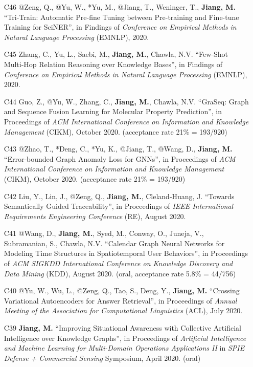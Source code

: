 \documentclass[10pt]{article}
\newenvironment{myindentpar}[1]%
{\begin{list}{}%
         {\setlength{\leftmargin}{#1}}%
         \item[]%
}
{\end{list}}
\newcounter{list}
\begin{document}
\begin{myindentpar}{0.00cm}
\begin{enumerate}[leftmargin=.5cm]
\item[C46] @Zeng, Q., @Yu, W., *Yu, M., @Jiang, T., Weninger, T., \textbf{Jiang, M.} ``Tri-Train: Automatic Pre-fine Tuning between Pre-training and Fine-tune Training for SciNER'', in Findings of \textit{Conference on Empirical Methods in Natural Language Processing} (EMNLP), 2020.

\item[C45] Zhang, C., Yu, L., Saebi, M., \textbf{Jiang, M.}, Chawla, N.V. ``Few-Shot Multi-Hop Relation Reasoning over Knowledge Bases'', in Findings of \textit{Conference on Empirical Methods in Natural Language Processing} (EMNLP), 2020.

\item[C44] Guo, Z., @Yu, W., Zhang, C., \textbf{Jiang, M.}, Chawla, N.V. ``GraSeq: Graph and Sequence Fusion Learning for Molecular Property Prediction'', in Proceedings of \textit{ACM International Conference on Information and Knowledge Management} (CIKM), October 2020. (acceptance rate 21\% = 193/920)
		
\item[C43] @Zhao, T., *Deng, C., *Yu, K., @Jiang, T., @Wang, D., \textbf{Jiang, M.} ``Error-bounded Graph Anomaly Loss for GNNs'', in Proceedings of \textit{ACM International Conference on Information and Knowledge Management} (CIKM), October 2020. (acceptance rate 21\% = 193/920)

\item[C42] Liu, Y., Lin, J., @Zeng, Q., \textbf{Jiang, M.}, Cleland-Huang, J. ``Towards Semantically Guided Traceability'', in Proceedings of \textit{IEEE International Requirements Engineering Conference} (RE), August 2020.	

\item[C41] @Wang, D., \textbf{Jiang, M.}, Syed, M., Conway, O., Juneja, V., Subramanian, S., Chawla, N.V. ``Calendar Graph Neural Networks for Modeling Time Structures in Spatiotemporal User Behaviors'', in Proceedings of \textit{ACM SIGKDD International Conference on Knowledge Discovery and Data Mining} (KDD), August 2020. (oral, acceptance rate 5.8\% = 44/756)

\item[C40] @Yu, W., Wu, L., @Zeng, Q., Tao, S., Deng, Y., \textbf{Jiang, M.} ``Crossing Variational Autoencoders for Answer Retrieval'', in Proceedings of \textit{Annual Meeting of the Association for Computational Linguistics} (ACL), July 2020.

\item[C39] \textbf{Jiang, M.} ``Improving Situational Awareness with Collective Artificial Intelligence over Knowledge Graphs'', in Proceedings of \textit{Artificial Intelligence and Machine Learning for Multi-Domain Operations Applications II} in \textit{SPIE Defense + Commercial Sensing} Symposium, April 2020. (oral)


\end{enumerate}
\end{myindentpar}
\end{document}
